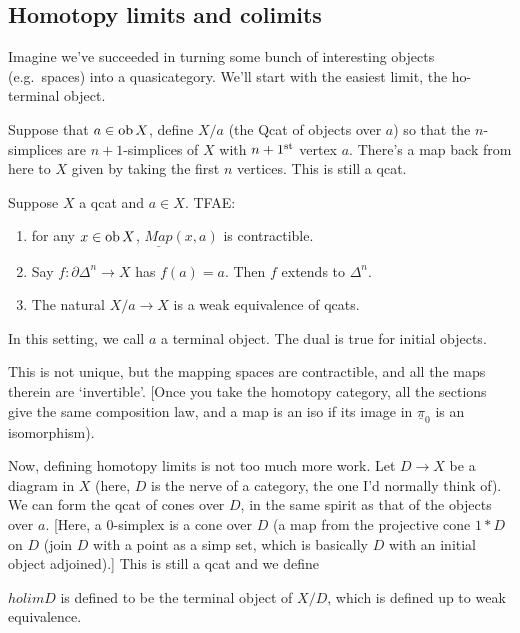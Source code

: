 \begin{SaulInftyOneCats}
\subsection*{Homotopy limits and colimits}
Imagine we've succeeded in turning some bunch of interesting objects (e.g.\ spaces) into a quasicategory. We'll start with the easiest limit, the ho-terminal object.

Suppose that $a\in\textup{ob}\, X$, define $X/a$ (the Qcat of objects over $a$) so that the $n$-simplices are $n+1$-simplices of $X$ with $n+1^{\textup{st}}$ vertex $a$. There's a map back from here to $X$ given by taking the first $n$ vertices. This is still a qcat.
\begin{thm*}[ThmDef]
Suppose $X$ a qcat and $a\in X$. TFAE:
\begin{enumerate}\squishlist
\item for any $x\in\textup{ob}\, X$, $\underline{Map}(x,a)$ is contractible.
\item Say $f:\partial \Delta^n\to X$ has $f(a)=a$. Then $f$ extends to $\Delta^n$.
\item The natural $X/a\to X$ is a weak equivalence of qcats.
\end{enumerate}
In this setting, we call $a$ a terminal object. The dual is true for initial objects.
\end{thm*}
This is not unique, but the mapping spaces are contractible, and all the maps therein are `invertible'. [Once you take the homotopy category, all the sections give the same composition law, and a map is an iso if its image in $\underline\pi_0$ is an isomorphism).

Now, defining homotopy limits is not too much more work. Let $D\to X$ be a diagram in $X$ (here, $D$ is the nerve of a category, the one I'd normally think of). We can form the qcat of cones over $D$, in the same spirit as that of the objects over $a$. [Here, a 0-simplex is a cone over $D$ (a map from the projective cone $1*D$ on $D$ (join $D$ with a point as a simp set, which is basically $D$ with an initial object adjoined).] This is still a qcat and we define
\begin{defn*}
$holim D$ is defined to be the terminal object of $X/D$, which is defined up to weak equivalence.
\end{defn*}

\end{SaulInftyOneCats}
